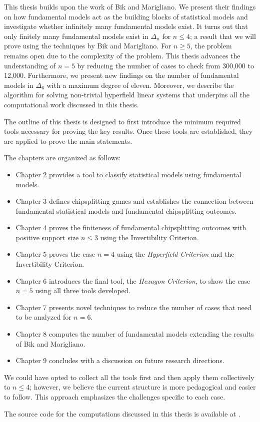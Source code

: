 This thesis builds upon the work of Bik and Marigliano. We present their findings on how fundamental models act as the building blocks of statistical models and investigate whether infinitely many fundamental models exist. It turns out that only finitely many fundamental models exist in \( \Delta_n \) for \( n \leq 4 \); a result that we will prove using the techniques by Bik and Marigliano. For \( n \geq 5 \), the problem remains open due to the complexity of the problem. This thesis advances the understanding of \( n = 5 \) by reducing the number of cases to check from 300,000 to 12,000. Furthermore, we present new findings on the number of fundamental models in \( \Delta_6 \) with a maximum degree of eleven. Moreover, we describe the algorithm for solving non-trivial hyperfield linear systems that underpins all the computational work discussed in this thesis. 

The outline of this thesis is designed to first introduce the minimum required tools necessary for proving the key results. Once these tools are established, they are applied to prove the main statements. 

The chapters are organized as follows:
\begin{itemize}
    \item Chapter 2 provides a tool to classify statistical models using fundamental models.
    \item Chapter 3 defines chipsplitting games and establishes the connection between fundamental statistical models and fundamental chipsplitting outcomes.
    \item Chapter 4 proves the finiteness of fundamental chipsplitting outcomes with positive support size \( n \leq 3 \) using the Invertibility Criterion.
    \item Chapter 5 proves the case \( n = 4 \) using the \emph{Hyperfield Criterion} and the Invertibility Criterion.
    \item Chapter 6 introduces the final tool, the \emph{Hexagon Criterion}, to show the case \( n = 5 \) using all three tools developed.
    \item Chapter 7 presents novel techniques to reduce the number of cases that need to be analyzed for \( n = 6 \).
    \item Chapter 8 computes the number of fundamental models extending the results of Bik and Marigliano.
    \item Chapter 9 concludes with a discussion on future research directions.
\end{itemize}


We could have opted to collect all the tools first and then apply them collectively to \( n \leq 4 \); however, we believe the current structure is more pedagogical and easier to follow. This approach emphasizes the challenges specific to each case.

The source code for the computations discussed in this thesis is available at \cite{ducrepo}.